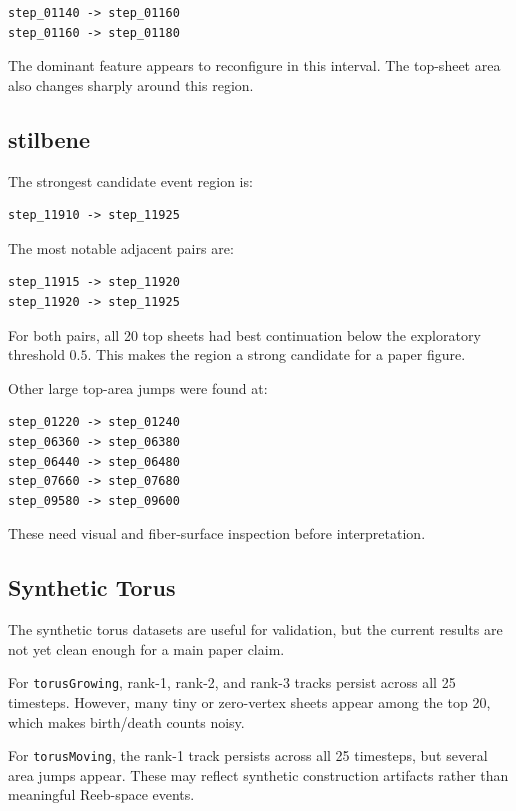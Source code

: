 \documentclass[11pt]{article}
\begin{document}
\begin{verbatim}
step_01140 -> step_01160
step_01160 -> step_01180
\end{verbatim}

The dominant feature appears to reconfigure in this interval. The top-sheet
area also changes sharply around this region.

\subsection{stilbene}

The strongest candidate event region is:

\begin{verbatim}
step_11910 -> step_11925
\end{verbatim}

The most notable adjacent pairs are:

\begin{verbatim}
step_11915 -> step_11920
step_11920 -> step_11925
\end{verbatim}

For both pairs, all 20 top sheets had best continuation below the exploratory
threshold \(0.5\). This makes the region a strong candidate for a paper figure.

Other large top-area jumps were found at:

\begin{verbatim}
step_01220 -> step_01240
step_06360 -> step_06380
step_06440 -> step_06480
step_07660 -> step_07680
step_09580 -> step_09600
\end{verbatim}

These need visual and fiber-surface inspection before interpretation.

\subsection{Synthetic Torus}

The synthetic torus datasets are useful for validation, but the current results
are not yet clean enough for a main paper claim.

For \texttt{torusGrowing}, rank-1, rank-2, and rank-3 tracks persist across all
25 timesteps. However, many tiny or zero-vertex sheets appear among the top 20,
which makes birth/death counts noisy.

For \texttt{torusMoving}, the rank-1 track persists across all 25 timesteps,
but several area jumps appear. These may reflect synthetic construction
artifacts rather than meaningful Reeb-space events.
\end{document}

